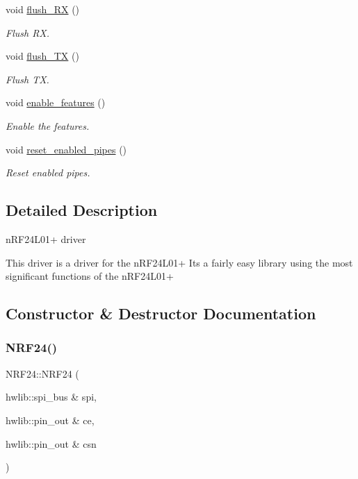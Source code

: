 \begin{DoxyCompactItemize}
void \hyperlink{classNRF24_af2837ae132e4513f0b3c08ad4389243a}{flush\+\_\+\+RX} ()
\begin{DoxyCompactList}\small\item\em Flush RX. \end{DoxyCompactList}\item 
void \hyperlink{classNRF24_ae1be2e84f708565766cbf162f2efcd42}{flush\+\_\+\+TX} ()
\begin{DoxyCompactList}\small\item\em Flush TX. \end{DoxyCompactList}\item 
void \hyperlink{classNRF24_a12b6526fe059ca63ecd9ecda7f4099c8}{enable\+\_\+features} ()
\begin{DoxyCompactList}\small\item\em Enable the features. \end{DoxyCompactList}\item 
void \hyperlink{classNRF24_a18094a007c01ae62bd86a6e314bf0416}{reset\+\_\+enabled\+\_\+pipes} ()
\begin{DoxyCompactList}\small\item\em Reset enabled pipes. \end{DoxyCompactList}\end{DoxyCompactItemize}


\subsection{Detailed Description}
n\+R\+F24\+L01+ driver 

This driver is a driver for the n\+R\+F24\+L01+ It\textquotesingle{}s a fairly easy library using the most significant functions of the n\+R\+F24\+L01+ 

\subsection{Constructor \& Destructor Documentation}
\mbox{\label{classNRF24_a09269e76d1390baf00cc06d8f99ae422}} 
\subsubsection{\texorpdfstring{N\+R\+F24()}{NRF24()}}
{\footnotesize\ttfamily N\+R\+F24\+::\+N\+R\+F24 (\begin{DoxyParamCaption}\item[{hwlib\+::spi\+\_\+bus \&}]{spi,  }\item[{hwlib\+::pin\+\_\+out \&}]{ce,  }\item[{hwlib\+::pin\+\_\+out \&}]{csn }\end{DoxyParamCaption})\hspace{0.3cm}{\ttfamily [inline]}}




